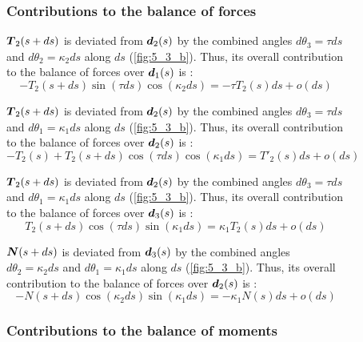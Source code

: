 \begin{figure}[p]
	\begin{fullpage}
	\subsubsection{Contributions to the balance of forces}
	\vspace{10pt}
	
	$\boldsymbol{T}_2(s+ds)$ is deviated from $\boldsymbol{d}_2(s)$ by the combined angles $d\theta_3 = \tau ds$ and $d\theta_2 = \kappa_2 ds$ along $ds$ (\cref{fig:5_3_b}). Thus, its overall contribution to the balance of forces over $\boldsymbol{d}_1(s)$ is : 
	\begin{equation*}
		-T_2(s+ds) \sin(\tau ds) \cos(\kappa_2 ds) = -\tau T_2(s) ds + o(ds)
	\end{equation*}	
	
	$\boldsymbol{T}_2(s+ds)$ is deviated from $\boldsymbol{d}_2(s)$ by the combined angles $d\theta_3 = \tau ds$ and $d\theta_1 = \kappa_1 ds$ along $ds$ (\cref{fig:5_3_b}). Thus, its overall contribution to the balance of forces over $\boldsymbol{d}_2(s)$ is : 
	\begin{equation*}
		-T_2(s) + T_2(s+ds) \cos(\tau ds) \cos(\kappa_1 ds) = T'_2 (s) ds + o(ds)
	\end{equation*}	
	
	$\boldsymbol{T}_2(s+ds)$ is deviated from $\boldsymbol{d}_2(s)$ by the combined angles $d\theta_3 = \tau ds$ and $d\theta_1 = \kappa_1 ds$ along $ds$ (\cref{fig:5_3_b}). Thus, its overall contribution to the balance of forces over $\boldsymbol{d}_3(s)$ is : 
	\begin{equation*}
		T_2(s+ds) \cos(\tau ds) \sin(\kappa_1 ds) = \kappa_1 T_2(s) ds + o(ds)
	\end{equation*}
		
	$\boldsymbol{N}(s+ds)$ is deviated from $\boldsymbol{d}_3(s)$ by the combined angles $d\theta_2 = \kappa_2 ds$ and $d\theta_1 = \kappa_1 ds$ along $ds$ (\cref{fig:5_3_b}). Thus, its overall contribution to the balance of forces over $\boldsymbol{d}_2(s)$ is : 
	\begin{equation*}
		-N(s+ds) \cos(\kappa_2 ds) \sin(\kappa_1 ds) = -\kappa_1 N(s) ds + o(ds)
	\end{equation*}	
	\vspace{10pt}

	\subsubsection{Contributions to the balance of moments}
	\vspace{10pt}
	

\end{fullpage}
\end{figure}
